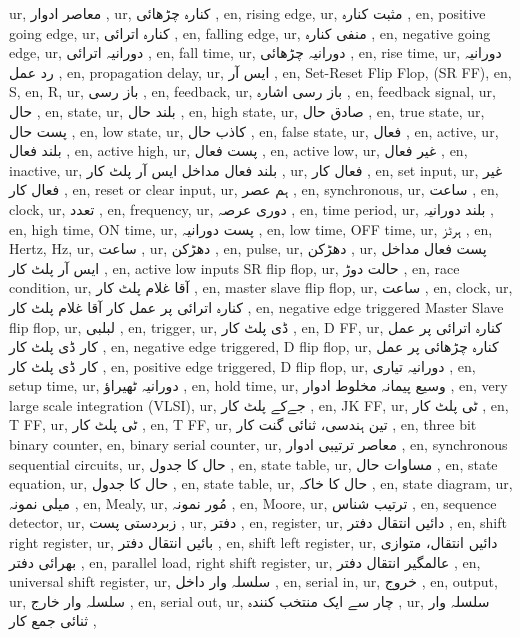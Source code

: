 ur, معاصر ادوار ,
ur, کنارہ چڑھائی ,
en, rising edge,
ur, مثبت کنارہ ,
en, positive going edge,
ur, کنارہ اترائی ,
en, falling edge,
ur, منفی کنارہ ,
en, negative going edge,
ur, دورانیہ اترائی ,
en, fall time,
ur, دورانیہ چڑھائی ,
en, rise time,
ur, دورانیہ رد عمل ,
en, propagation delay,
ur, ایس آر ,
en, Set-Reset Flip Flop, (SR FF),
en, S,
en, R,
ur, باز رسی  ,
en, feedback,
ur, باز رسی اشارہ ,
en, feedback signal,
ur, حال ,
en, state,
ur, بلند حال ,
en, high state,
ur, صادق حال ,
en, true state,
ur, پست حال ,
en, low state,
ur, کاذب حال ,
en, false state,
ur, فعال ,
en, active,
ur,  بلند فعال ,
en, active high,
ur,  پست فعال ,
en, active low,
ur, غیر فعال ,
en, inactive,
ur, بلند فعال مداخل ایس آر پلٹ کار ,
ur, فعال کار ,
en, set input,
ur, غیر فعال کار ,
en, reset or clear input,
ur, ہم عصر ,
en, synchronous,
ur, ساعت ,
en, clock,
ur, تعدد ,
en, frequency,
ur, دوری عرصہ ,
en, time period,
ur, بلند دورانیہ ,
en, high time, ON time,
ur, پست دورانیہ ,
en, low time, OFF time,
ur, ہرٹز ,
en, Hertz, Hz,
ur, ساعت ,
ur, دھڑکن  ,
en, pulse,
ur, دھڑکن  ,
ur, پست فعال مداخل ایس آر پلٹ کار ,
en, active low inputs SR flip flop,
ur, حالت دوڑ ,
en, race condition,
ur, آقا غلام پلٹ کار ,
en, master slave flip flop,
ur, ساعت ,
en, clock,
ur, کنارہ اترائی پر عمل کار آقا غلام پلٹ کار ,
en, negative edge triggered Master Slave flip flop,
ur, لبلبی ,
en, trigger,
ur, ڈی پلٹ کار ,
en, D FF,
ur, کنارہ اترائی پر عمل کار ڈی پلٹ کار ,
en, negative edge triggered, D flip flop,
ur, کنارہ چڑھائی پر عمل کار ڈی پلٹ کار ,
en, positive edge triggered, D flip flop,
ur,  دورانیہ تیاری ,
en, setup time,
ur,  دورانیہ ٹھیراؤ ,
en, hold time,
ur,  وسیع پیمانہ مخلوط ادوار ,
en, very large scale integration (VLSI),
ur, جےکے پلٹ کار ,
en, JK FF,
ur, ٹی پلٹ کار ,
en, T FF,
ur, ٹی پلٹ کار ,
en, T FF,
ur, تین ہندسی، ثنائی گنت کار ,
en, three bit binary counter,
en, binary serial counter,
ur, معاصر ترتیبی ادوار ,
en, synchronous sequential circuits,
ur, حال کا جدول ,
en, state table,
ur, مساوات حال ,
en, state equation,
ur, حال کا جدول ,
en, state table,
ur, حال کا خاکہ ,
en, state diagram,
ur, میلی نمونہ ,
en, Mealy,
ur, مُور نمونہ ,
en, Moore,
ur, ترتیب شناس ,
en, sequence detector,
ur,  زبردستی پست  ,
ur, دفتر ,
en, register,
ur,  دائیں انتقال دفتر ,
en, shift right register,
ur, بائیں انتقال دفتر ,
en, shift left register,
ur, دائیں انتقال، متوازی بھرائی دفتر ,
en, parallel load, right shift register,
ur, عالمگیر انتقال دفتر  ,
en, universal shift register,
ur,  سلسلہ وار داخل  ,
en, serial in,
ur,  خروج  ,
en, output,
ur,  سلسلہ وار خارج  ,
en, serial out,
ur,  چار سے ایک منتخب کنندہ  ,
ur,  سلسلہ وار ثنائی جمع کار  ,
